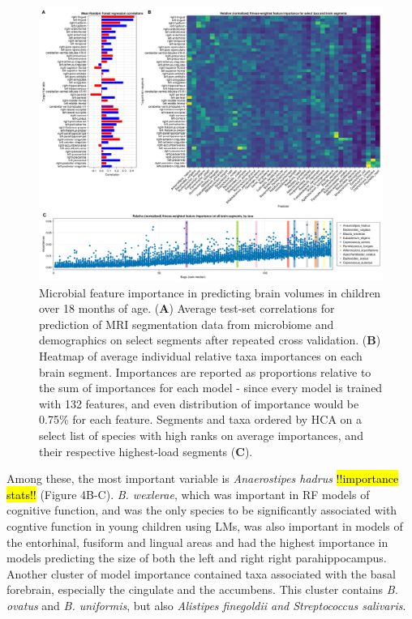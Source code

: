 \documentclass{article}
\begin{document}
\begin{figure}
    \centering
    \includegraphics[width=\textwidth]{assets/Figure4.png}
    \caption{
        Microbial feature importance in predicting brain volumes in children over 18 months of age.
        (\textbf{A}) Average test-set correlations for prediction of MRI segmentation
        data from microbiome and demographics on select segments after repeated
        cross validation. (\textbf{B}) Heatmap of average individual relative taxa
        importances on each brain segment. Importances are reported as
        proportions relative to the sum of importances for each model - since
        every model is trained with 132 features, and even distribution of
        importance would be 0.75\% for each feature. Segments and taxa ordered
        by HCA on a select list of species with high ranks on average importances,
        and their respective highest-load segments (\textbf{C}).
    }
    \label{fig:4}
\end{figure}

Among these, the most important variable is \emph{Anaerostipes hadrus}
\hl{!!importance stats!!} (Figure 4B-C).
\emph{B. wexlerae}, which was important in RF models of cognitive function,
and was the only species to be significantly associated
with cogntive function in young children using LMs, 
was also important in models of the entorhinal, fusiform and lingual areas
and had the highest importance in models predicting the size of
both the left and right right parahippocampus.
Another cluster of model importance contained taxa associated with the
basal forebrain, especially the cingulate and the accumbens. This
cluster contains \emph{B. ovatus} and \emph{B. uniformis},
but also \emph{Alistipes finegoldii and Streptococcus salivaris}.
\end{document}
